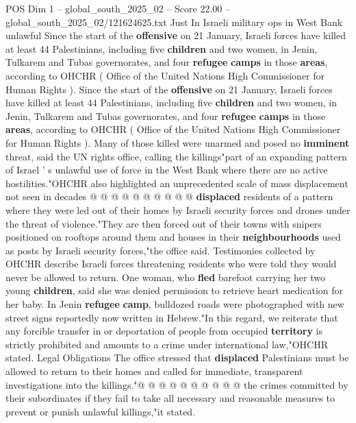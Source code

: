 \begin{textsample}{POS Dim 1 – global\_south\_2025\_02 – Score 22.00 – global\_south\_2025\_02/121624625.txt}  \label{ex:f1_pos_418}
Just In Israeli military ops in West Bank unlawful Since the start of the \textbf{offensive} on 21 January, Israeli forces have killed at least 44 Palestinians, including five \textbf{children} and two women, in Jenin, Tulkarem and Tubas governorates, and four \textbf{refugee} \textbf{camps} in those \textbf{areas}, according to OHCHR ( Office of the United Nations High Commissioner for Human Rights ).
Since the start of the \textbf{offensive} on 21 January, Israeli forces have killed at least 44 Palestinians, including five \textbf{children} and two women, in Jenin, Tulkarem and Tubas governorates, and four \textbf{refugee} \textbf{camps} in those \textbf{areas}, according to OHCHR ( Office of the United Nations High Commissioner for Human Rights ).
Many of those killed were unarmed and posed no \textbf{imminent} threat, said the UN rights office, calling the killings"part of an expanding pattern of Israel ' s unlawful use of force in the West Bank where there are no active hostilities."OHCHR also highlighted an unprecedented scale of mass displacement not seen in decades @ @ @ @ @ @ @ @ @ @ \textbf{displaced} residents of a pattern where they were led out of their homes by Israeli security forces and drones under the threat of violence."They are then forced out of their towns with snipers positioned on rooftops around them and houses in their \textbf{neighbourhoods} used as posts by Israeli security forces,"the office said.
Testimonies collected by OHCHR describe Israeli forces threatening residents who were told they would never be allowed to return.
One woman, who \textbf{fled} barefoot carrying her two young \textbf{children}, said she was denied permission to retrieve heart medication for her baby.
In Jenin \textbf{refugee} \textbf{camp}, bulldozed roads were photographed with new street signs reportedly now written in Hebrew."In this regard, we reiterate that any forcible transfer in or deportation of people from occupied \textbf{territory} is strictly prohibited and amounts to a crime under international law,"OHCHR stated.
Legal Obligations The office stressed that \textbf{displaced} Palestinians must be allowed to return to their homes and called for immediate, transparent investigations into the killings."@ @ @ @ @ @ @ @ @ @ the crimes committed by their subordinates if they fail to take all necessary and reasonable measures to prevent or punish unlawful killings,"it stated.

\end{textsample}
